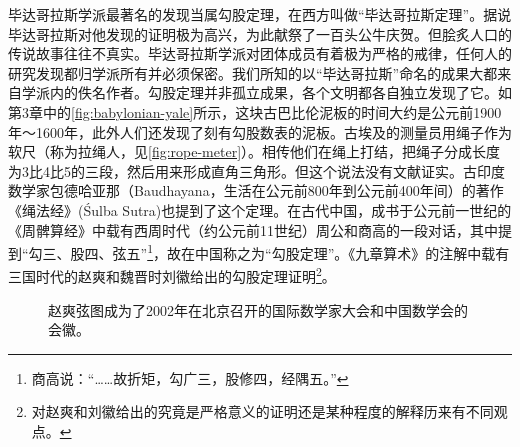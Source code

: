 \documentclass[b5paper]{ctexart}
\begin{document}
 
毕达哥拉斯学派最著名的发现当属勾股定理，在西方叫做“毕达哥拉斯定理”。据说毕达哥拉斯对他发现的证明极为高兴，为此献祭了一百头公牛庆贺。但脍炙人口的传说故事往往不真实。毕达哥拉斯学派对团体成员有着极为严格的戒律，任何人的研究发现都归学派所有并必须保密。我们所知的以“毕达哥拉斯”命名的成果大都来自学派内的佚名作者。勾股定理并非孤立成果，各个文明都各自独立发现了它。如第3章中的\cref{fig:babylonian-yale}所示，这块古巴比伦泥板的时间大约是公元前1900年～1600年，此外人们还发现了刻有勾股数表的泥板。古埃及的测量员用绳子作为软尺（称为拉绳人，见\cref{fig:rope-meter}）。相传他们在绳上打结，把绳子分成长度为3比4比5的三段，然后用来形成直角三角形。但这个说法没有文献证实。古印度数学家包德哈亚那（Baudhayana，生活在公元前800年到公元前400年间）的著作《绳法经》(Śulba Sutra)也提到了这个定理。在古代中国，成书于公元前一世纪的《周髀算经》中载有西周时代（约公元前11世纪）周公和商高的一段对话，其中提到“勾三、股四、弦五”\footnote{商高说：“……故折矩，勾广三，股修四，经隅五。”}，故在中国称之为“勾股定理”。《九章算术》的注解中载有三国时代的赵爽和魏晋时刘徽给出的勾股定理证明\footnote{对赵爽和刘徽给出的究竟是严格意义的证明还是某种程度的解释历来有不同观点。}。

\begin{figure}[htbp]
 \centering
  \quad
 \caption{赵爽弦图成为了2002年在北京召开的国际数学家大会和中国数学会的会徽。\label{fig:cms-zhaoshuang}}
\end{figure}
\end{document}
